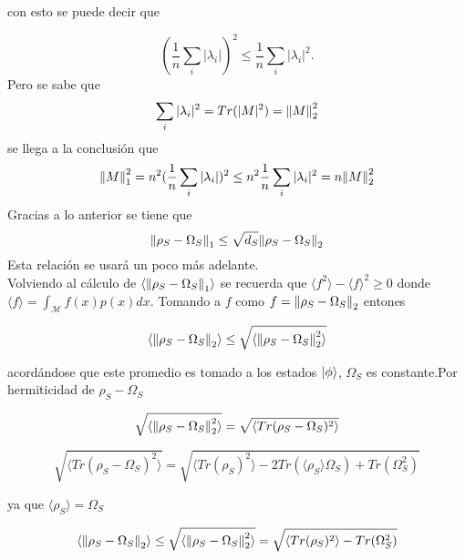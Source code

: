 con esto se puede decir que

\begin{equation}
(\frac{1}{n}\sum_{i} |\lambda_{i}|)^{2} \le \frac{1}{n}\sum_{i} |\lambda_{i}|^{2}.
\end{equation}
Pero se sabe que 
\begin{equation}
\sum_{i} |\lambda_{i}|^2=Tr(|M|^2)=\norm{M}_{2}^{2}
\end{equation}
se llega a la conclusión que 
\begin{equation}
\norm{M}_{1}^{2} = n^{2}(\frac{1}{n} \sum_{i}| \lambda_{i} | )^{2} \le  n^{2} \frac{1}{n} \sum_{i} | \lambda_{i} |^{2}= n\norm{M}_{2}^{2}
\end{equation}
Gracias a lo anterior se tiene que 
\begin{equation}\label{eq:0}
\norm{\rho_{S} - \Omega_{S}}_{1} \le \sqrt{d_{S}}\norm{\rho_{S} - \Omega_{S}}_{2}
\end{equation}
Esta relación se usará un poco más adelante.\\

Volviendo al cálculo de $\langle \norm{\rho_{S} -\Omega_{S}}_{1} \rangle$  se recuerda que $ \langle f^{2} \rangle-\langle f \rangle^{2} \ge 0$ donde $\langle f \rangle = \int_{\mathcal{M}} f(x)p(x)dx$. Tomando a $f$ como $f= \norm{\rho_{S}-\Omega_{S}}_{2}$ entones

\begin{equation}
\langle \norm{ \rho_{S}-\Omega_{S} }_{2} \rangle \le \sqrt{ \langle \norm{ \rho_{S}-\Omega_{S} }_{2}^{2}\rangle}
\end{equation}

acordándose que este promedio es tomado a los estados $\ket{\phi}$, $\Omega_{S}$ es constante.Por hermiticidad de $\rho_{S}-\Omega_{S}$ 

\begin{equation}
\sqrt{\langle \norm{ \rho_{S}-\Omega_{S} }_{2}^{2}\rangle} = \sqrt{\langle Tr(\rho_{S}-\Omega_{S})^{2} \rangle}
\end{equation}

\begin{equation}
\sqrt{\langle Tr( \rho_{S}-\Omega_{S})^{2} \rangle}= \sqrt{\langle Tr(\rho_{S})^{2}\rangle -2Tr(\langle \rho_{S} \rangle \Omega_{S})+Tr(\Omega_{S}^{2}) }
\end{equation}

ya que $\langle \rho_{S} \rangle=\Omega_{S}$

\begin{equation}
\langle \norm{ \rho_{S}-\Omega_{S} }_{2}\rangle \le \sqrt{\langle \norm{ \rho_{S}-\Omega_{S} }_{2}^{2}\rangle}= \sqrt{\langle Tr(\rho_{S})^{2}\rangle -Tr(\Omega_{S}^{2}) }
\end{equation}

